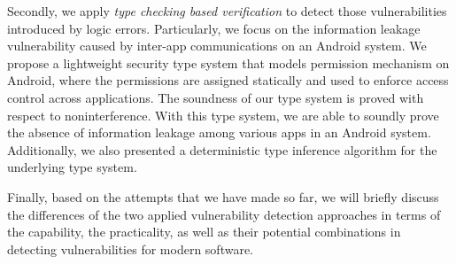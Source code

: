 Secondly, we apply \emph{type checking based verification} to detect those vulnerabilities introduced by logic errors. Particularly, we focus on the information leakage vulnerability caused by inter-app communications on an Android system. 
We propose a lightweight security type system that models permission mechanism on Android, where the permissions are assigned statically and used to enforce access control across applications. 
The soundness of our type system is proved with respect to noninterference. With this type system, we are able to soundly prove the absence of information leakage among various apps in an Android system.
 Additionally, we also presented a deterministic type inference algorithm for the underlying type system. 

Finally, based on the attempts that we have made so far, we will briefly discuss the differences of the two applied vulnerability detection approaches in terms of the capability, the practicality, as well as their potential combinations in detecting vulnerabilities for modern software.

